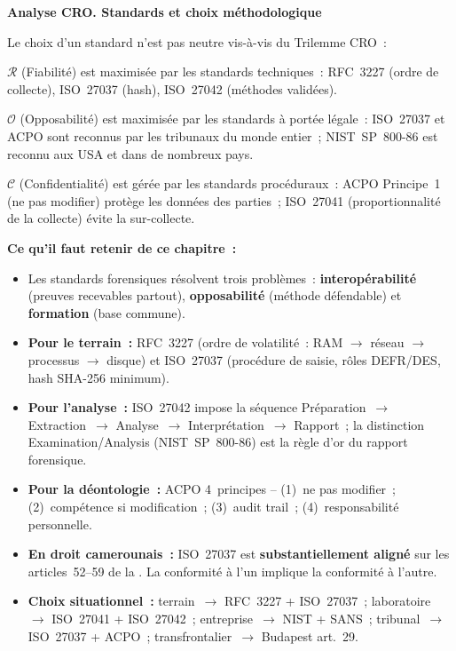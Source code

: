 \begin{boxCRO}
\textbf{Analyse CRO. Standards et choix méthodologique}

Le choix d'un standard n'est pas neutre vis-à-vis du Trilemme CRO~:

$\mathcal{R}$ (Fiabilité) est maximisée par les standards techniques~:
RFC~3227 (ordre de collecte), ISO~27037 (hash), ISO~27042 (méthodes validées).

$\mathcal{O}$ (Opposabilité) est maximisée par les standards à portée légale~:
ISO~27037 et ACPO sont reconnus par les tribunaux du monde entier~;
NIST~SP~800-86 est reconnu aux USA et dans de nombreux pays.

$\mathcal{C}$ (Confidentialité) est gérée par les standards procéduraux~:
ACPO Principe~1 (ne pas modifier) protège les données des parties~;
ISO~27041 (proportionnalité de la collecte) évite la sur-collecte.

\end{boxCRO}

\separateur

\begin{boxresume}
\textbf{Ce qu'il faut retenir de ce chapitre~:}
\begin{itemize}
    \item Les standards forensiques résolvent trois problèmes~:
          \textbf{interopérabilité} (preuves recevables partout),
          \textbf{opposabilité} (méthode défendable) et \textbf{formation}
          (base commune).

    \item \textbf{Pour le terrain~:} RFC~3227 (ordre de volatilité~:
          RAM $\to$ réseau $\to$ processus $\to$ disque) et ISO~27037
          (procédure de saisie, rôles DEFR/DES, hash SHA-256 minimum).

    \item \textbf{Pour l'analyse~:} ISO~27042 impose la séquence
          Préparation~$\to$ Extraction~$\to$ Analyse~$\to$ Interprétation~$\to$
          Rapport~; la distinction Examination/Analysis (NIST~SP~800-86)
          est la règle d'or du rapport forensique.

    \item \textbf{Pour la déontologie~:} ACPO 4~principes -- (1)~ne
          pas modifier~; (2)~compétence si modification~; (3)~audit trail~;
          (4)~responsabilité personnelle.

    \item \textbf{En droit camerounais~:} ISO~27037 est
          \textbf{substantiellement aligné} sur les articles~52--59 de la
          . La conformité à l'un implique la conformité
          à l'autre.

    \item \textbf{Choix situationnel~:} terrain~$\to$ RFC~3227 + ISO~27037~;
          laboratoire~$\to$ ISO~27041 + ISO~27042~; entreprise~$\to$ NIST + SANS~;
          tribunal~$\to$ ISO~27037 + ACPO~; transfrontalier~$\to$ Budapest art.~29.
\end{itemize}
\end{boxresume}

